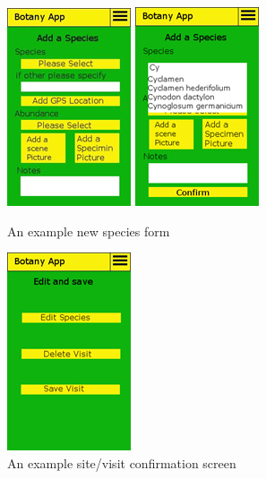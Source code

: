         \begin{figure}
            \centering
            \includegraphics[scale=1]{uiDesign/botanyAppAddSpecies1.png}
            \includegraphics[scale=1]{uiDesign/botanyAppAddSpecies2.png}
            \caption{An example new species form}
            \label{fig:newSpecies}
        \end{figure}

        \begin{figure}
            \centering
            \includegraphics[scale=1]{uiDesign/botanyAppEditSaveSiteVisit.png}
            \caption{An example site/visit confirmation screen}
            \label{fig:editSaveSite}
        \end{figure}

